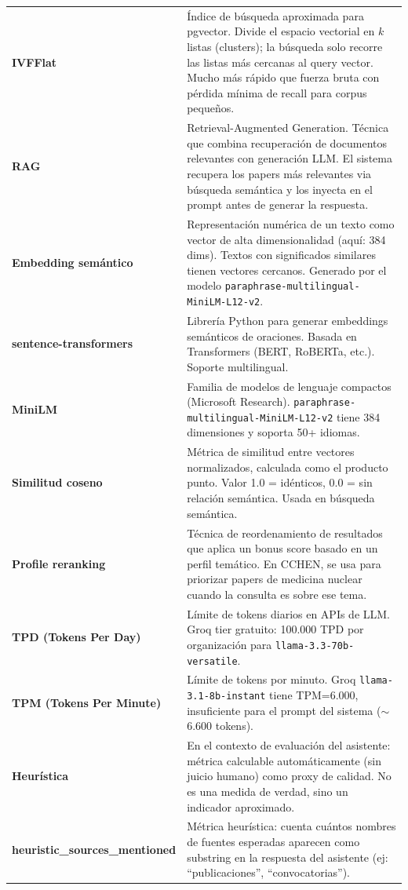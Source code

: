\documentclass[12pt,a4paper]{report}
\begin{document}
\begin{longtable}{L{4cm} L{10cm}}
  \textbf{IVFFlat} & Índice de búsqueda aproximada para pgvector. Divide el espacio vectorial en $k$ listas (clusters); la búsqueda solo recorre las listas más cercanas al query vector. Mucho más rápido que fuerza bruta con pérdida mínima de recall para corpus pequeños. \\
  \textbf{RAG} & Retrieval-Augmented Generation. Técnica que combina recuperación de documentos relevantes con generación LLM. El sistema recupera los papers más relevantes via búsqueda semántica y los inyecta en el prompt antes de generar la respuesta. \\
  \textbf{Embedding semántico} & Representación numérica de un texto como vector de alta dimensionalidad (aquí: 384 dims). Textos con significados similares tienen vectores cercanos. Generado por el modelo \texttt{paraphrase-multilingual-MiniLM-L12-v2}. \\
  \textbf{sentence-transformers} & Librería Python para generar embeddings semánticos de oraciones. Basada en Transformers (BERT, RoBERTa, etc.). Soporte multilingual. \\
  \textbf{MiniLM} & Familia de modelos de lenguaje compactos (Microsoft Research). \texttt{paraphrase-multilingual-MiniLM-L12-v2} tiene 384 dimensiones y soporta 50+ idiomas. \\
  \textbf{Similitud coseno} & Métrica de similitud entre vectores normalizados, calculada como el producto punto. Valor 1.0 = idénticos, 0.0 = sin relación semántica. Usada en búsqueda semántica. \\
  \textbf{Profile reranking} & Técnica de reordenamiento de resultados que aplica un bonus score basado en un perfil temático. En CCHEN, se usa para priorizar papers de medicina nuclear cuando la consulta es sobre ese tema. \\
  \textbf{TPD (Tokens Per Day)} & Límite de tokens diarios en APIs de LLM. Groq tier gratuito: 100.000 TPD por organización para \texttt{llama-3.3-70b-versatile}. \\
  \textbf{TPM (Tokens Per Minute)} & Límite de tokens por minuto. Groq \texttt{llama-3.1-8b-instant} tiene TPM=6.000, insuficiente para el prompt del sistema ($\sim$6.600 tokens). \\
  \textbf{Heurística} & En el contexto de evaluación del asistente: métrica calculable automáticamente (sin juicio humano) como proxy de calidad. No es una medida de verdad, sino un indicador aproximado. \\
  \textbf{heuristic\_sources\_mentioned} & Métrica heurística: cuenta cuántos nombres de fuentes esperadas aparecen como substring en la respuesta del asistente (ej: ``publicaciones'', ``convocatorias''). \\

\end{longtable}
\end{document}
